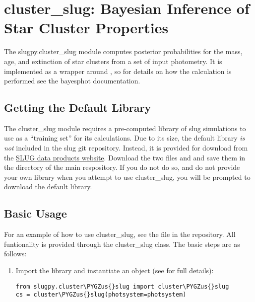 \documentclass[letterpaper,10pt,english]{sphinxmanual}
\def\PYGZus{\char`\_}
\begin{document}
\chapter{cluster\_slug: Bayesian Inference of Star Cluster Properties}
\label{cluster_slug:sec-cluster-slug}\label{cluster_slug::doc}\label{cluster_slug:cluster-slug-bayesian-inference-of-star-cluster-properties}
The slugpy.cluster\_slug module computes posterior probabilities for the mass, age, and extinction of star clusters from a set of input photometry.  It is implemented as a wrapper around {\hyperref[bayesphot:sec-bayesphot]{\emph{}}}, so for details on how the calculation is performed see the bayesphot documentation.


\section{Getting the Default Library}
\label{cluster_slug:getting-the-default-library}
The cluster\_slug module requires a pre-computed library of slug simulations to use as a ``training set'' for its calculations. Due to its size, the default library \emph{is not} included in the slug git repository. Instead, it is provided for download from the \href{http://www.slugsps.com/data}{SLUG data products website}. Download the two files  and  and save them in the  directory of the main respository. If you do not do so, and do not provide your own library when you attempt to use cluster\_slug, you will be prompted to download the default library.


\section{Basic Usage}
\label{cluster_slug:basic-usage}
For an example of how to use cluster\_slug, see the file  in the repository. All funtionality is provided through the cluster\_slug class. The basic steps are as follows:
\begin{enumerate}
\item {} 
Import the library and instantiate an  object (see {\hyperref[cluster_slug:ssec-cluster-slug-full]{\emph{}}} for full details):

\begin{Verbatim}[commandchars=\\\{\}]
from slugpy.cluster\PYGZus{}slug import cluster\PYGZus{}slug
cs = cluster\PYGZus{}slug(photsystem=photsystem)
\end{Verbatim}

\end{enumerate}
\end{document}
